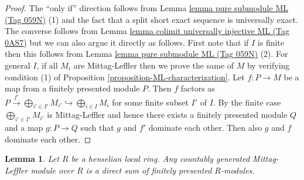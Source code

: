 \documentclass{amsart}
\theoremstyle{plain}
\newtheorem{lemma}[subsection]{Lemma}
\theoremstyle{definition}
\theoremstyle{remark}
\numberwithin{equation}{subsection}
\begin{document}
\begin{proof}
The ``only if'' direction follows from Lemma \href{https://stacks.math.columbia.edu/tag/059N}{lemma pure submodule ML (Tag 059N)} (1)
and the fact that a split short exact sequence is universally exact. The
converse follows from Lemma \href{https://stacks.math.columbia.edu/tag/0AS7}{lemma colimit universally injective ML (Tag 0AS7)}
but we can also argue it directly as follows. First note that if $I$ is
finite then this follows from Lemma
\href{https://stacks.math.columbia.edu/tag/059N}{lemma pure submodule ML (Tag 059N)} (2).  For general $I$, if all $M_i$ are
Mittag-Leffler then we prove the same of $M$ by verifying condition (1) of
Proposition \ref{proposition-ML-characterization}.
Let $f: P \to M$ be a map from a finitely presented module $P$.
Then $f$ factors as
$P \xrightarrow{f'} \bigoplus_{i' \in I'} M_{i'} \hookrightarrow
\bigoplus_{i \in I} M_i$
for some finite subset $I'$ of $I$.  By the finite case
$\bigoplus_{i' \in I'} M_{i'}$ is Mittag-Leffler and hence there exists
a finitely presented  module $Q$ and a map $g: P \to Q$ such that $g$
and $f'$ dominate each other.  Then also $g$ and $f$ dominate each other.
\end{proof}


\begin{lemma}
\label{lemma-split-ML-henselian}
Let $R$ be a henselian local ring.
Any countably generated Mittag-Leffler module over $R$ is a direct
sum of finitely presented $R$-modules.
\end{lemma}
\end{document}
